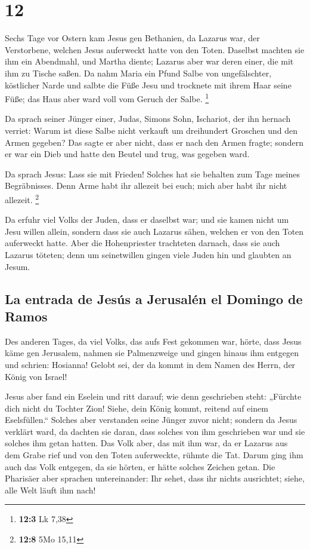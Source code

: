 \hypertarget{section-11}{%
\section{12}\label{section-11}}

 Sechs Tage vor Ostern kam Jesus gen Bethanien, da Lazarus
war, der Verstorbene, welchen Jesus auferweckt hatte von den Toten.
 Daselbst machten sie ihm ein Abendmahl, und Martha
diente; Lazarus aber war deren einer, die mit ihm zu Tische saßen.
 Da nahm Maria ein Pfund Salbe von ungefälschter,
köstlicher Narde und salbte die Füße Jesu und trocknete mit ihrem Haar
seine Füße; das Haus aber ward voll vom Geruch der Salbe. \footnote{\textbf{12:3}
  Lk 7,38}

 Da sprach seiner Jünger einer, Judas, Simons Sohn,
Ischariot, der ihn hernach verriet:  Warum ist diese Salbe
nicht verkauft um dreihundert Groschen und den Armen gegeben?
 Das sagte er aber nicht, dass er nach den Armen fragte;
sondern er war ein Dieb und hatte den Beutel und trug, was gegeben ward.

 Da sprach Jesus: Lass sie mit Frieden! Solches hat sie
behalten zum Tage meines Begräbnisses.  Denn Arme habt ihr
allezeit bei euch; mich aber habt ihr nicht allezeit. \footnote{\textbf{12:8}
  5Mo 15,11}

 Da erfuhr viel Volks der Juden, dass er daselbst war; und
sie kamen nicht um Jesu willen allein, sondern dass sie auch Lazarus
sähen, welchen er von den Toten auferweckt hatte.  Aber
die Hohenpriester trachteten darnach, dass sie auch Lazarus töteten;
 denn um seinetwillen gingen viele Juden hin und glaubten
an Jesum.

\hypertarget{la-entrada-de-jesuxfas-a-jerusaluxe9n-el-domingo-de-ramos}{%
\subsection{La entrada de Jesús a Jerusalén el Domingo de
Ramos}\label{la-entrada-de-jesuxfas-a-jerusaluxe9n-el-domingo-de-ramos}}

 Des anderen Tages, da viel Volks, das aufs Fest gekommen
war, hörte, dass Jesus käme gen Jerusalem,  nahmen sie
Palmenzweige und gingen hinaus ihm entgegen und schrien: Hosianna!
Gelobt sei, der da kommt in dem Namen des Herrn, der König von Israel!

 Jesus aber fand ein Eselein und ritt darauf; wie denn
geschrieben steht:  „Fürchte dich nicht du Tochter Zion!
Siehe, dein König kommt, reitend auf einem Eselsfüllen.``
 Solches aber verstanden seine Jünger zuvor nicht;
sondern da Jesus verklärt ward, da dachten sie daran, dass solches von
ihm geschrieben war und sie solches ihm getan hatten. 
Das Volk aber, das mit ihm war, da er Lazarus aus dem Grabe rief und von
den Toten auferweckte, rühmte die Tat.  Darum ging ihm
auch das Volk entgegen, da sie hörten, er hätte solches Zeichen getan.
 Die Pharisäer aber sprachen untereinander: Ihr sehet,
dass ihr nichts ausrichtet; siehe, alle Welt läuft ihm nach!

